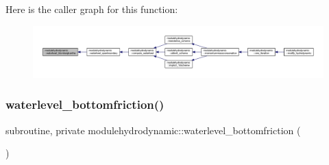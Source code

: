 Here is the caller graph for this function\+:\nopagebreak
\begin{figure}[H]
\begin{center}
\leavevmode
\includegraphics[width=350pt]{namespacemodulehydrodynamic_ae5c38adbe04a8331efddb3eb147a9de3_icgraph}
\end{center}
\end{figure}
\mbox{\label{namespacemodulehydrodynamic_ae585f218a774bfbfdd6f830f47de4d2a}} 
\subsubsection{\texorpdfstring{waterlevel\+\_\+bottomfriction()}{waterlevel\_bottomfriction()}}
{\footnotesize\ttfamily subroutine, private modulehydrodynamic\+::waterlevel\+\_\+bottomfriction (\begin{DoxyParamCaption}{ }\end{DoxyParamCaption})\hspace{0.3cm}{\ttfamily [private]}}

